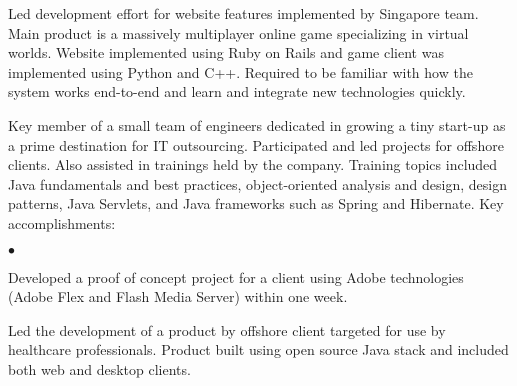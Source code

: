 \documentclass[10.5pt]{article}
\begin{document}
\begin{longtext}
Led development effort for website features implemented by Singapore team. Main product is a massively multiplayer online
game specializing in virtual worlds. Website implemented using Ruby on Rails and game client was implemented using Python
and C++. Required to be familiar with how the system works end-to-end and learn and integrate new technologies quickly.
\tinyskip
\end{longtext}
\begin{longtext}
Key member of a small team of engineers dedicated in growing a tiny start-up as a prime destination for IT outsourcing. 
Participated and led projects for offshore clients. Also assisted in trainings held by the company. 
Training topics included Java fundamentals and best practices, object-oriented analysis and design, design patterns, Java Servlets, and Java frameworks such as Spring and Hibernate.
Key accomplishments:
\begin{list}{$\bullet$}{
}
\item Developed a proof of concept project for a client using Adobe technologies (Adobe Flex
and Flash Media Server) within one week.
\item Led the development of a product by offshore client targeted for use
by healthcare professionals. Product built using open source Java stack and included both web and desktop clients.

\end{list}
\end{longtext}
\end{document}
